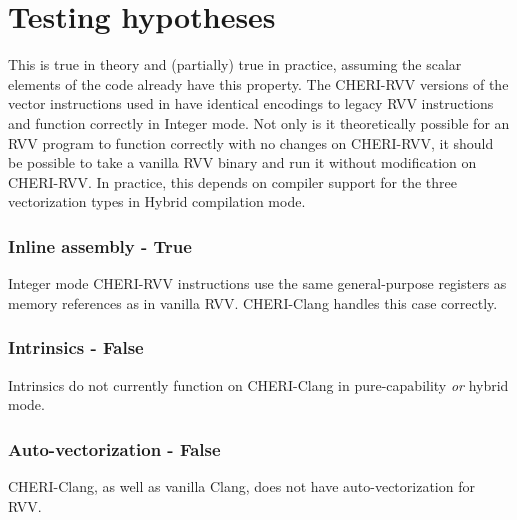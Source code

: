 \section{Testing hypotheses}


This is true in theory and (partially) true in practice, assuming the scalar elements of the code already have this property.
The CHERI-RVV versions of the vector instructions used in  have identical encodings to legacy RVV instructions and function correctly in Integer mode.
Not only is it theoretically possible for an RVV program to function correctly with no changes on CHERI-RVV, it should be possible to take a vanilla RVV binary and run it without modification on CHERI-RVV.
In practice, this depends on compiler support for the three vectorization types in Hybrid compilation mode.

\subsubsection*{Inline assembly - True}
Integer mode CHERI-RVV instructions use the same general-purpose registers as memory references as in vanilla RVV.
CHERI-Clang handles this case correctly.

\subsubsection*{Intrinsics - False}
Intrinsics do not currently function on CHERI-Clang in pure-capability \emph{or} hybrid mode.

\subsubsection*{Auto-vectorization - False}
CHERI-Clang, as well as vanilla Clang, does not have auto-vectorization for RVV.



